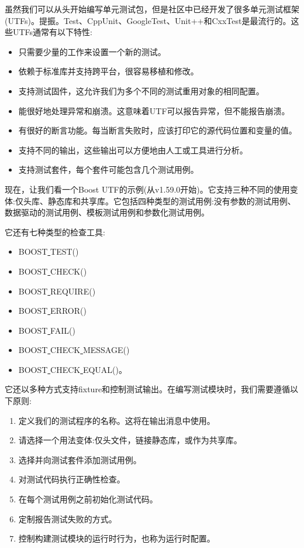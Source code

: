 虽然我们可以从头开始编写单元测试包，但是社区中已经开发了很多单元测试框架(UTFs)。提振。Test、CppUnit、GoogleTest、Unit++和CxxTest是最流行的。这些UTFs通常有以下特性:\par

\begin{itemize}
	\item 只需要少量的工作来设置一个新的测试。
	\item 依赖于标准库并支持跨平台，很容易移植和修改。
	\item 支持测试固件，这允许我们为多个不同的测试重用对象的相同配置。
	\item 能很好地处理异常和崩溃。这意味着UTF可以报告异常，但不能报告崩溃。
	\item 有很好的断言功能。每当断言失败时，应该打印它的源代码位置和变量的值。
	\item 支持不同的输出，这些输出可以方便地由人工或工具进行分析。
	\item 支持测试套件，每个套件可能包含几个测试用例。
\end{itemize}

现在，让我们看一个Boost UTF的示例(从v1.59.0开始)。它支持三种不同的使用变体:仅头库、静态库和共享库。它包括四种类型的测试用例:没有参数的测试用例、数据驱动的测试用例、模板测试用例和参数化测试用例。 \par
它还有七种类型的检查工具:
\begin{itemize}
	\item BOOST\underline{ }TEST()
	\item BOOST\underline{ }CHECK()
	\item BOOST\underline{ }REQUIRE()
	\item BOOST\underline{ }ERROR()
	\item BOOST\underline{ }FAIL()
	\item BOOST\underline{ }CHECK\underline{ }MESSAGE()
	\item BOOST\underline{ }CHECK\underline{ }EQUAL()。
\end{itemize}

它还以多种方式支持fixture和控制测试输出。在编写测试模块时，我们需要遵循以下原则: \par

\begin{enumerate}
	\item 定义我们的测试程序的名称。这将在输出消息中使用。 
	\item 请选择一个用法变体:仅头文件，链接静态库，或作为共享库。 
	\item 选择并向测试套件添加测试用例。  
	\item 对测试代码执行正确性检查。
	\item 在每个测试用例之前初始化测试代码。 
	\item 定制报告测试失败的方式。
	\item 控制构建测试模块的运行时行为，也称为运行时配置。
\end{enumerate}

